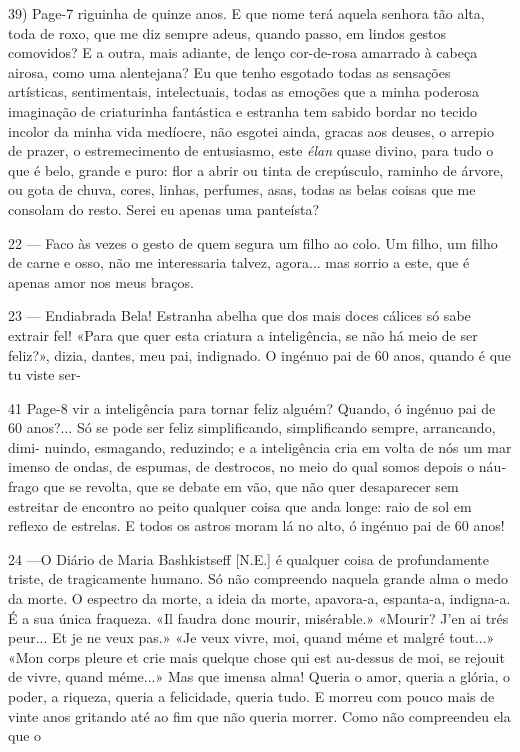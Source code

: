 39)
Page-7
riguinha de quinze anos. E que nome terá aquela 
senhora tão alta, toda de roxo, que me diz sempre adeus,
quando passo, em lindos gestos comovidos? E a outra,
mais adiante, de lenço cor-de-rosa amarrado à cabeça
airosa, como uma alentejana? Eu que tenho esgotado
todas as sensações artísticas, sentimentais, intelectuais,
todas as emoções que a minha poderosa imaginação
de criaturinha fantástica e estranha tem sabido bordar
no tecido incolor da minha vida medíocre, não esgotei
ainda, gracas aos deuses, o arrepio de prazer, o 
estremecimento de entusiasmo, este \textit{élan} quase divino,
para tudo o que é belo, grande e puro: flor a abrir ou
tinta de crepúsculo, raminho de árvore, ou gota de
chuva, cores, linhas, perfumes, asas, todas as belas
coisas que me consolam do resto. Serei eu apenas uma
panteísta?

22 — Faco às vezes o gesto de quem segura um filho
ao colo. Um filho, um filho de carne e osso, não me
interessaria talvez, agora... mas sorrio a este, que é
apenas amor nos meus braços.

23 — Endiabrada Bela! Estranha abelha que dos mais
doces cálices só sabe extrair fel! «Para que quer
esta criatura a inteligência, se não há meio de ser
feliz?», dizia, dantes, meu pai, indignado. O 
ingénuo pai de 60 anos, quando é que tu viste ser-

41
Page-8
vir a inteligência para tornar feliz alguém? Quando,
ó ingénuo pai de 60 anos?... Só se pode ser feliz
simplificando, simplificando sempre, arrancando, dimi-
nuindo, esmagando, reduzindo; e a inteligência cria
em volta de nós um mar imenso de ondas, de espumas,
de destrocos, no meio do qual somos depois o náu-
frago que se revolta, que se debate em vão, que não
quer desaparecer sem estreitar de encontro ao peito
qualquer coisa que anda longe: raio de sol em reflexo
de estrelas. E todos os astros moram lá no alto, ó
ingénuo pai de 60 anos!

24 —O Diário de Maria Bashkistseff [N.E.] é qualquer coisa
de profundamente triste, de tragicamente humano. Só
não compreendo naquela grande alma o medo da
morte. O espectro da morte, a ideia da morte, 
apavora-a, espanta-a, indigna-a. É a sua única fraqueza.
«Il faudra donc mourir, misérable.» «Mourir? J’en ai
trés peur... Et je ne veux pas.» «Je veux vivre, moi,
quand méme et malgré tout...» «Mon corps pleure et
crie mais quelque chose qui est au-dessus de moi, se
rejouit de vivre, quand méme...» Mas que imensa
alma! Queria o amor, queria a glória, o poder, a
riqueza, queria a felicidade, queria tudo. E morreu com
pouco mais de vinte anos gritando até ao fim que
não queria morrer. Como não compreendeu ela que o

